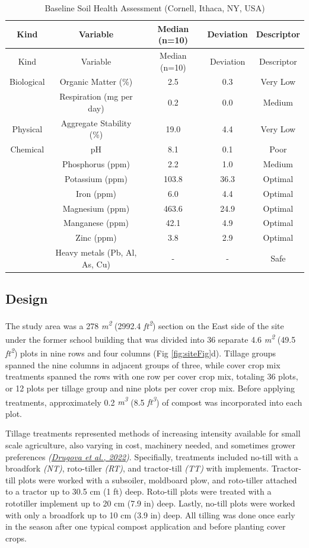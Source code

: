 \documentclass[
  12pt,
]{article}
\begin{document}
\begin{longtable}[]{@{}ccccc@{}}
\caption{\label{tab:chemKbl}Baseline Soil Health Assessment (Cornell, Ithaca, NY, USA)}\tabularnewline
\toprule
Kind & Variable & Median (n=10) & Deviation & Descriptor \\
\midrule
\endfirsthead
\toprule
Kind & Variable & Median (n=10) & Deviation & Descriptor \\
\midrule
\endhead
Biological & Organic Matter (\%) & 2.5 & 0.3 & Very Low \\
& Respiration (mg per day) & 0.2 & 0.0 & Medium \\
Physical & Aggregate Stability (\%) & 19.0 & 4.4 & Very Low \\
Chemical & pH & 8.1 & 0.1 & Poor \\
& Phosphorus (ppm) & 2.2 & 1.0 & Medium \\
& Potassium (ppm) & 103.8 & 36.3 & Optimal \\
& Iron (ppm) & 6.0 & 4.4 & Optimal \\
& Magnesium (ppm) & 463.6 & 24.9 & Optimal \\
& Manganese (ppm) & 42.1 & 4.9 & Optimal \\
& Zinc (ppm) & 3.8 & 2.9 & Optimal \\
& Heavy metals (Pb, Al, As, Cu) & - & - & Safe \\
\bottomrule
\end{longtable}

\hypertarget{design}{%
\subsection{Design}\label{design}}

The study area was a 278 \emph{m\textsuperscript{2}} (2992.4 \emph{ft\textsuperscript{2}}) section on the East side of the site under the former school building that was divided into 36 separate 4.6 \emph{m\textsuperscript{2}} (49.5 \emph{ft\textsuperscript{2}}) plots in nine rows and four columns (Fig \ref{fig:siteFig}d).
Tillage groups spanned the nine columns in adjacent groups of three, while cover crop mix treatments spanned the rows with one row per cover crop mix, totaling 36 plots, or 12 plots per tillage group and nine plots per cover crop mix.
Before applying treatments, approximately 0.2 \emph{m\textsuperscript{3}} (8.5 \emph{ft\textsuperscript{3}}) of compost was incorporated into each plot.

Tillage treatments represented methods of increasing intensity available for small scale agriculture, also varying in cost, machinery needed, and sometimes grower preferences \emph{(\protect\hyperlink{ref-drugova22}{Drugova et al., 2022})}.
Specifially, treatments included no-till with a broadfork \emph{(NT)}, roto-tiller \emph{(RT)}, and tractor-till \emph{(TT)} with implements.
Tractor-till plots were worked with a subsoiler, moldboard plow, and roto-tiller attached to a tractor up to 30.5 cm (1 ft) deep.
Roto-till plots were treated with a rototiller implement up to 20 cm (7.9 in) deep.
Lastly, no-till plots were worked with only a broadfork up to 10 cm (3.9 in) deep.
All tilling was done once early in the season after one typical compost application and before planting cover crops.
\end{document}
